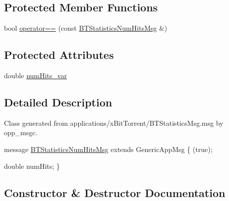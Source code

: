 \subsection*{Protected Member Functions}
\begin{DoxyCompactItemize}
\item 
bool \hyperlink{classBTStatisticsNumHitsMsg_ab81878625fc5d4d3b9be33811da01e8e}{operator==} (const \hyperlink{classBTStatisticsNumHitsMsg}{B\+T\+Statistics\+Num\+Hits\+Msg} \&)
\end{DoxyCompactItemize}
\subsection*{Protected Attributes}
\begin{DoxyCompactItemize}
\item 
double \hyperlink{classBTStatisticsNumHitsMsg_a88f5611c41dac9956bc6a07fe15f28eb}{num\+Hits\+\_\+var}
\end{DoxyCompactItemize}


\subsection{Detailed Description}
Class generated from {\ttfamily applications/x\+Bit\+Torrent/\+B\+T\+Statistics\+Msg.\+msg} by opp\+\_\+msgc. 
\begin{DoxyPre}
message \hyperlink{classBTStatisticsNumHitsMsg}{BTStatisticsNumHitsMsg} extends GenericAppMsg
\{
     (true);\end{DoxyPre}



\begin{DoxyPre}    double numHits;
\}
\end{DoxyPre}
 

\subsection{Constructor \& Destructor Documentation}
\hypertarget{classBTStatisticsNumHitsMsg_a48a37fdce2832cda8c98f6864a602464}{}

